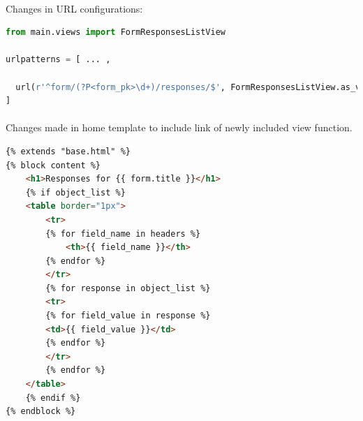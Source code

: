 \paragraph{} Changes in URL configurations:
\begin{lstlisting}[language=python,numbers=none]
from main.views import FormResponsesListView

urlpatterns = [ ... ,

  url(r'^form/(?P<form_pk>\d+)/responses/$', FormResponsesListView.as_view(),name='form-responses'),
]
\end{lstlisting}

\paragraph{}Changes made in home template to include link of newly included view function.

\begin{lstlisting}[language=html,numbers=none]
{% extends "base.html" %}
{% block content %}
	<h1>Responses for {{ form.title }}</h1>
	{% if object_list %}
	<table border="1px">
		<tr>
		{% for field_name in headers %}
			<th>{{ field_name }}</th>
		{% endfor %}
		</tr>
		{% for response in object_list %}
		<tr>
		{% for field_value in response %}
		<td>{{ field_value }}</td>
		{% endfor %}
		</tr>
		{% endfor %}
	</table>
	{% endif %}
{% endblock %}
\end{lstlisting}

\begin{center}
\end{center}
